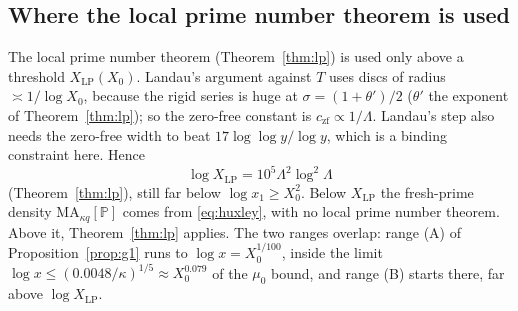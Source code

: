 \subsection{Where the local prime number theorem is used}
The local prime number theorem (Theorem~\ref{thm:lp}) is used only above a threshold $X_{\mathrm{LP}}(X_0)$. Landau's argument against
$T$ uses discs of radius $\asymp1/\log X_0$, because the rigid series is huge at $\sigma=(1+\theta')/2$ ($\theta'$ the exponent of Theorem~\ref{thm:lp}); so the zero-free constant is
$c_{\mathrm{zf}}\propto1/\Lambda$. Landau's step also needs the zero-free width to beat $17\log\log y/\log y$, which is a binding
constraint here. Hence
\begin{equation}\label{eq:XLP}
  \log X_{\mathrm{LP}}=10^5\Lambda^2\log^2\Lambda
\end{equation}
(Theorem~\ref{thm:lp}), still far below $\log x_1\ge X_0^2$. Below $X_{\mathrm{LP}}$ the fresh-prime density
$\mathrm{MA}_{\kappa q}[\mathbb P]$ comes from \eqref{eq:huxley}, with no local prime number theorem. Above it, Theorem~\ref{thm:lp}
applies. The two ranges overlap: range (A) of Proposition~\ref{prop:g1} runs to $\log x=X_0^{1/100}$, inside the limit
$\log x\le(0.0048/\kappa)^{1/5}\approx X_0^{0.079}$ of the $\mu_0$ bound, and range (B) starts there, far above $\log X_{\mathrm{LP}}$.
\par\endgroup
